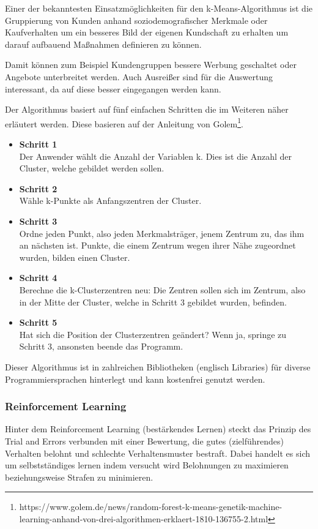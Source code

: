 Einer der bekanntesten Einsatzmöglichkeiten für den k-Means-Algorithmus ist die Gruppierung von Kunden anhand
soziodemografischer Merkmale oder Kaufverhalten um ein besseres Bild der eigenen Kundschaft zu erhalten um darauf
aufbauend Maßnahmen definieren zu können.

Damit können zum Beispiel Kundengruppen bessere Werbung geschaltet oder Angebote unterbreitet werden. Auch Ausreißer
sind für die Auswertung interessant, da auf diese besser eingegangen werden kann.

Der Algorithmus basiert auf fünf einfachen Schritten die im Weiteren näher erläutert werden. Diese basieren auf der
Anleitung von Golem\footnote{https://www.golem.de/news/random-forest-k-means-genetik-machine-learning-anhand-von-drei-algorithmen-erklaert-1810-136755-2.html}.

\begin{itemize}
    \item \textbf{Schritt 1} \\
    Der Anwender wählt die Anzahl der Variablen k. Dies ist die Anzahl der Cluster, welche gebildet werden sollen.
    \item \textbf{Schritt 2} \\
    Wähle k-Punkte als Anfangszentren der Cluster.
    \item \textbf{Schritt 3} \\
    Ordne jeden Punkt, also jeden Merkmalsträger, jenem Zentrum zu, das ihm an nächsten ist. Punkte, die einem Zentrum
    wegen ihrer Nähe zugeordnet wurden, bilden einen Cluster.
    \item \textbf{Schritt 4} \\
    Berechne die k-Clusterzentren neu: Die Zentren sollen sich im Zentrum, also in der Mitte der Cluster, welche in
    Schritt 3 gebildet wurden, befinden.
    \item \textbf{Schritt 5} \\
    Hat sich die Position der Clusterzentren geändert? Wenn ja, springe zu Schritt 3, ansonsten beende das Programm.
\end{itemize}

Dieser Algorithmus ist in zahlreichen Bibliotheken (englisch Libraries) für diverse Programmiersprachen hinterlegt und
kann kostenfrei genutzt werden.

\subsubsection{Reinforcement Learning}
Hinter dem Reinforcement Learning (bestärkendes Lernen) steckt das Prinzip des Trial and Errors verbunden mit einer
Bewertung, die gutes (zielführendes) Verhalten belohnt und schlechte Verhaltensmuster bestraft. Dabei handelt es sich
um selbstständiges lernen indem versucht wird Belohnungen zu maximieren beziehungsweise Strafen zu minimieren.

